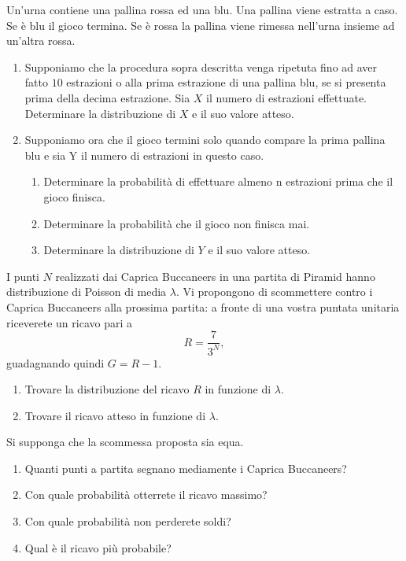 Un'urna contiene una pallina rossa ed una blu. Una pallina viene estratta a caso. Se è blu il gioco termina. Se è rossa la pallina viene rimessa nell'urna insieme ad un'altra rossa.
\begin{enumerate}
\item Supponiamo che la procedura sopra descritta venga ripetuta fino ad aver fatto $10$ estrazioni o alla prima estrazione di una pallina blu, se si presenta prima della decima estrazione. Sia $X$ il numero di estrazioni effettuate. Determinare la distribuzione di $X$ e il suo valore atteso.
\item Supponiamo ora che il gioco termini solo quando compare la prima pallina blu e sia Y il numero di estrazioni in questo caso.
\begin{enumerate}
\item Determinare la probabilità di effettuare almeno n estrazioni prima che il gioco finisca.
\item Determinare la probabilità che il gioco non finisca mai.
\item Determinare la distribuzione di $Y$ e il suo valore atteso.
\end{enumerate}
\end{enumerate}

I punti $N$ realizzati dai Caprica Buccaneers in una partita di Piramid hanno distribuzione di Poisson di media $\lambda $. Vi propongono di scommettere contro i Caprica Buccaneers alla prossima partita: a fronte di una vostra puntata unitaria riceverete un ricavo pari a
\begin{equation*}
R=\frac{7}{3^{N}} ,
\end{equation*}
guadagnando quindi $G=R-1$.
\begin{enumerate}
\item Trovare la distribuzione del ricavo $R$ in funzione di $\lambda $.
\item Trovare il ricavo atteso in funzione di $\lambda $.
\end{enumerate}

Si supponga che la scommessa proposta sia equa.
\begin{enumerate}
\item Quanti punti a partita segnano mediamente i Caprica Buccaneers?
\item Con quale probabilità otterrete il ricavo massimo?
\item Con quale probabilità non perderete soldi?
\item Qual è il ricavo più probabile?
\end{enumerate}








